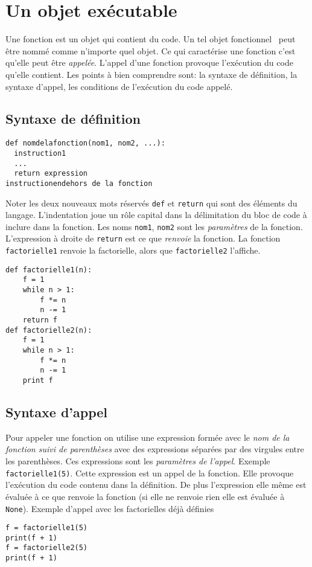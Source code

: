 

\section{Un objet exécutable}
Une fonction est un objet qui contient du code. Un tel objet \og fonctionnel\fg~ peut être nommé comme n'importe quel objet. Ce qui caractérise une fonction c'est qu'elle peut être \emph{appelée}. L'appel d'une fonction provoque l'exécution du code qu'elle contient. Les points à bien comprendre sont: la syntaxe de définition, la syntaxe d'appel, les conditions de l'exécution du code appelé.
\subsection{Syntaxe de définition}
\begin{verbatim}
def nomdelafonction(nom1, nom2, ...):
  instruction1
  ...
  return expression
instructionendehors de la fonction
\end{verbatim}
Noter les deux nouveaux mots réservés \verb|def| et \verb|return| qui sont des éléments du langage. L'indentation joue un rôle capital dans la délimitation du bloc de code à inclure dans la fonction. 
Les noms \verb|nom1|, \verb|nom2| sont les \emph{paramètres}  de la fonction. L'expression à droite de \verb|return| est ce que \emph{renvoie} la fonction.\newline
La fonction \texttt{factorielle1} renvoie la factorielle, alors que \texttt{factorielle2} l'affiche.
\begin{verbatim}
def factorielle1(n):
    f = 1
    while n > 1:
        f *= n
        n -= 1
    return f
def factorielle2(n):
    f = 1
    while n > 1:
        f *= n
        n -= 1
    print f
\end{verbatim}

\subsection{Syntaxe d'appel}
Pour appeler une fonction on utilise une expression formée avec le \emph{nom de la fonction suivi de parenthèses} avec des expressions séparées par des virgules entre les parenthèses. Ces expressions sont les \emph{paramètres de l'appel}. Exemple \verb|factorielle1(5)|. Cette expression est un appel de la fonction. Elle provoque l'exécution du code contenu dans la définition. De plus l'expression elle même est évaluée à ce que renvoie la fonction (si elle ne renvoie rien elle est évaluée à \verb|None|).\newline
Exemple d'appel avec les factorielles déjà définies
\begin{verbatim}
f = factorielle1(5)
print(f + 1)
f = factorielle2(5)
print(f + 1)
\end{verbatim}


